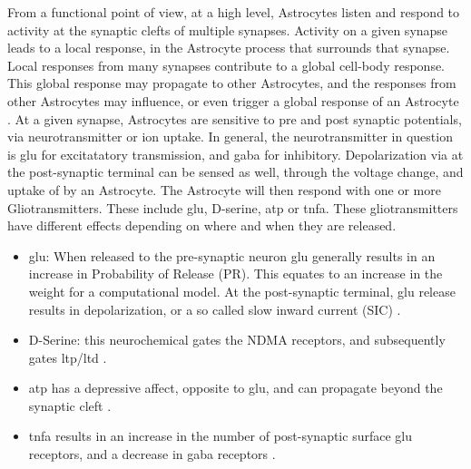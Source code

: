     From a functional point of view, at a high level, Astrocytes listen and
    respond to activity at the synaptic clefts of multiple synapses. Activity on
    a given synapse leads to a local response, in the Astrocyte process that
    surrounds that synapse. Local responses from many synapses contribute to a
    global cell-body response. This global response may propagate to other
    Astrocytes, and the responses from other Astrocytes may influence, or even
    trigger a global response of an Astrocyte \cite{min_2012}. At a given
    synapse, Astrocytes are sensitive to pre and post synaptic potentials, via
    neurotransmitter or ion uptake. In general, the neurotransmitter in question
    is \Gls{glu} for excitatatory transmission, and \Gls{gaba} for
    inhibitory. Depolarization via \kp at the post-synaptic terminal can be
    sensed as well, through the voltage change, and uptake of \kp by an
    Astrocyte. The Astrocyte will then respond with one or more
    Gliotransmitters. These include \Gls{glu}, D-serine, \Gls{atp} or
    \Gls{tnfa}. These gliotransmitters have different effects depending on where
    and when they are released.

    \begin{itemize}
      \item \Gls{glu}: When released to the pre-synaptic neuron \Gls{glu} generally
        results in an increase in Probability of Release (PR). This equates to
        an increase in the weight for a computational model. At the
        post-synaptic terminal, \Gls{glu} release results in depolarization, or
        a so called slow inward current (SIC) \cite{pitta_2016}.
      \item D-Serine: this neurochemical gates the NDMA receptors, and
        subsequently gates \Gls{ltp}/\Gls{ltd} \cite{mederos_2018}.
      \item \Gls{atp} has a depressive affect, opposite to \Gls{glu}, and can
        propagate beyond the synaptic cleft \cite{mederos_2018}.
      \item \Gls{tnfa} results in an increase in the number of post-synaptic
        surface \Gls{glu} receptors, and a decrease in \Gls{gaba} receptors
        \cite{chung_2015}.
    \end{itemize}


